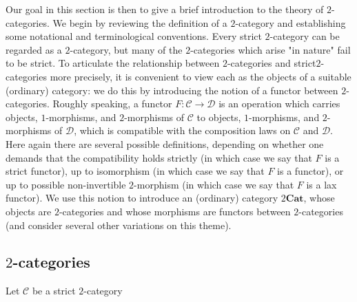 Our goal in this section is then to give a brief introduction to the theory of $2$-categories. We begin by reviewing the definition of a $2$-category and establishing some notational and terminological conventions. Every strict $2$-category can be regarded as a $2$-category, but many of the $2$-categories which arise "in nature" fail to be strict. To articulate the relationship between $2$-categories and strict$ 2$-categories more precisely, it is convenient to view each as the objects of a suitable (ordinary) category: we do this by introducing the notion of a functor between $2$-categories. Roughly speaking, a functor $F:\mathcal{C}\to\mathcal{D}$ is an operation which carries objects, $1$-morphisms, and $2$-morphisms of $\mathcal{C}$ to objects, $1$-morphisms, and $2$-morphisms of $\mathcal{D}$, which is compatible with the composition laws on $\mathcal{C}$ and $\mathcal{D}$. Here again there are several possible definitions, depending on whether one demands that the compatibility holds strictly (in which case we say that $F$ is a strict functor), up to isomorphism (in which case we say that $F$ is a functor), or up to possible non-invertible $2$-morphism (in which case we say that $F$ is a lax functor). We use this notion to introduce an (ordinary) category $2\mathbf{Cat}$, whose objects are $2$-categories and whose morphisms are functors between $2$-categories (and consider several other variations on this theme).
\subsection{\texorpdfstring{$2$}{2}-categories}
Let $\mathcal{C}$ be a strict $2$-category